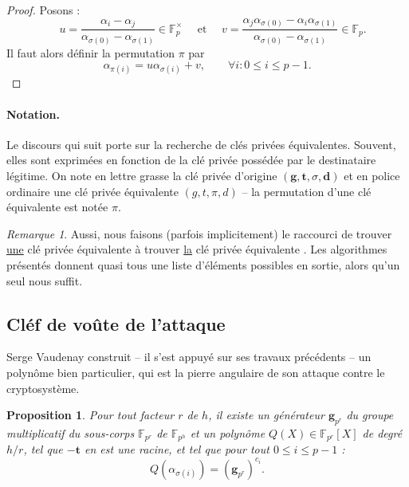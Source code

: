 \documentclass[a4paper, titlepage, 11pt]{article}
\newtheorem{prop}[theo]{Proposition}
\theoremstyle{definition}
\theoremstyle{remark}
\newtheorem{rema}[theo]{Remarque}
\def\gf #1{\mathbb{F}_{#1}}
\def\mbf #1{\mathbf{#1}}
\begin{document}
\begin{proof}
Posons :
$$\quad u = \frac{\alpha_i - \alpha_j}{\alpha_{\sigma(0)}- \alpha_{\sigma(1)}} \in \gf{p}^\times \quad \text{ et } \quad v =  \frac{\alpha_j\alpha_{\sigma(0)} - \alpha_i\alpha_{\sigma(1)}}{\alpha_{\sigma(0)}- \alpha_{\sigma(1)}} \in \gf{p}.$$
Il faut alors définir la permutation $\pi$ par
$$\alpha_{\pi(i)} = u\alpha_{\sigma(i)} + v,\qquad \forall i : 0\leqslant i \leqslant p-1.$$
\end{proof}

\paragraph{Notation.} Le discours qui suit porte sur la recherche de clés privées équivalentes. Souvent, elles sont exprimées en fonction de la clé privée possédée par le destinataire légitime. On note en lettre grasse la clé privée d'origine $(\mbf{g}, \mbf{t}, \sigma, \mbf{d})$ et en police ordinaire une clé privée équivalente $(g, t, \pi, d)$ -- la permutation d'une clé équivalente est notée $\pi$.

\begin{rema}
Aussi, nous faisons (parfois implicitement) le raccourci de \og{}trouver \underline{une} clé privée équivalente \fg{} à \og{}trouver \underline{la} clé privée équivalente \fg{}. Les algorithmes présentés donnent quasi tous une liste d'éléments possibles en sortie, alors qu'un seul nous suffit.
\end{rema}

\subsection{Cléf de voûte de l'attaque}

Serge Vaudenay construit -- il s'est appuyé sur ses travaux précédents -- un polynôme bien particulier, qui est la pierre angulaire de son attaque contre le cryptosystème.

\begin{prop}\label{prop:vaudenay}
Pour tout facteur $r$ de $h$, il existe un générateur $\mbf g_{p^r}$ du groupe multiplicatif du sous-corps $\gf{p^r}$ de $\gf{p^h}$ et un polynôme $Q(X) \in \gf{p^r}[X]$ de degré $h/r$, tel que $-\mbf t$ en est une racine, et tel que pour tout $0\leqslant i \leqslant p-1$ :
$$Q\left(\alpha_{\sigma(i)}\right) = (\mbf g_{p^r})^{c_i}.$$
\end{prop}
\end{document}
